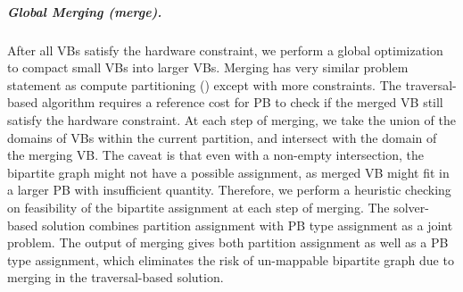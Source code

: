 \subparagraph{Global Merging (merge).}
After all VBs satisfy the hardware constraint, we perform a global optimization to compact small VBs into  larger VBs. 
Merging has very similar problem statement as compute partitioning () except with more constraints.
The traversal-based algorithm requires a reference cost for PB to check if the merged VB still satisfy the hardware constraint.
At each step of merging, we take the union of the domains of VBs within the current partition, and intersect with the domain of the merging VB.
The caveat is that even with a non-empty intersection, the bipartite graph might not have a possible assignment, as merged VB might fit in a larger PB with insufficient quantity.
Therefore, we perform a heuristic checking on feasibility of the bipartite assignment at each step of merging.
The solver-based solution combines partition assignment with PB type assignment as a joint problem. 
The output of merging gives both partition assignment as well as a PB type assignment, which eliminates the risk of un-mappable bipartite graph due to merging in the traversal-based solution.


